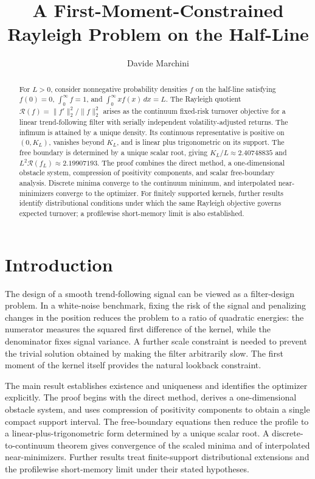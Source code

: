 \documentclass[11pt]{amsart}
\title[First-moment-constrained Rayleigh problem]{A First-Moment-Constrained Rayleigh Problem on the Half-Line}
\author{Davide Marchini}
\date{}
\theoremstyle{definition}
\theoremstyle{remark}
\newcommand{\Rcal}{\mathcal R}
\begin{document}
\begin{abstract}
For $L>0$, consider nonnegative probability densities $f$ on the half-line satisfying
$f(0)=0$, $\int_0^\infty f=1$, and $\int_0^\infty xf(x)\,dx=L$. The Rayleigh
quotient $\Rcal(f)=\|f'\|_2^2/\|f\|_2^2$ arises as the continuum fixed-risk
turnover objective for a linear trend-following filter with serially independent
volatility-adjusted returns. The infimum is attained by a unique density. Its
continuous representative is positive on $(0,K_L)$, vanishes beyond $K_L$, and
is linear plus trigonometric on its support. The free boundary is determined by a
unique scalar root, giving $K_L/L\approx2.40748835$ and
$L^2\Rcal(f_L)\approx2.19907193$. The proof combines the direct method, a
one-dimensional obstacle system, compression of positivity components, and scalar
free-boundary analysis. Discrete minima converge to the continuum minimum, and
interpolated near-minimizers converge to the optimizer. For finitely supported
kernels, further results identify distributional conditions under which the same
Rayleigh objective governs expected turnover; a profilewise short-memory limit is
also established.
\end{abstract}

\maketitle


\section{Introduction}
The design of a smooth trend-following signal can be viewed as a filter-design
problem. In a white-noise benchmark, fixing the risk of the signal and
penalizing changes in the position reduces the problem to a ratio of quadratic
energies: the numerator measures the squared first difference of the kernel,
while the denominator fixes signal variance. A further scale constraint is
needed to prevent the trivial solution obtained by making the filter
arbitrarily slow. The first moment of the kernel itself provides the natural
lookback constraint.

The main result establishes existence and uniqueness and identifies the optimizer
explicitly. The proof begins with the direct method, derives a one-dimensional
obstacle system, and uses compression of positivity components to obtain a single
compact support interval. The free-boundary equations then reduce the profile to a
linear-plus-trigonometric form determined by a unique scalar root. A
discrete-to-continuum theorem gives convergence of the scaled minima and of
interpolated near-minimizers. Further results treat finite-support distributional
extensions and the profilewise short-memory limit under their stated hypotheses.
\end{document}
